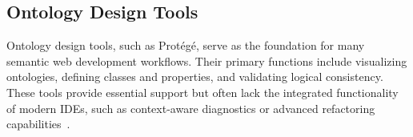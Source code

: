 \subsection*{Ontology Design Tools}

Ontology design tools, such as Protégé, serve as the foundation for many semantic web development workflows. 
Their primary functions include visualizing ontologies, defining classes and properties, and validating logical consistency.
These tools provide essential support but often lack the integrated functionality of modern IDEs, such as context-aware diagnostics or advanced refactoring capabilities~\cite{ComparingOntologyBuildingTools}.


